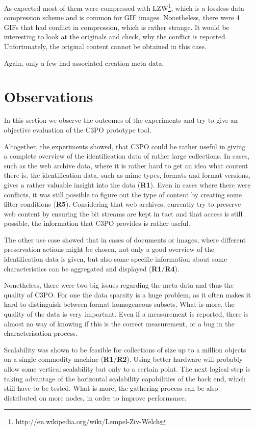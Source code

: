 As expected most of them were compressed with LZW\footnote{http://en.wikipedia.org/wiki/Lempel-Ziv-Welch}, which is a lossless data compression scheme and is common for GIF images. Nonetheless, there were 4 GIFs that had conflict in compression, which is rather strange. It would be interesting to look at the originals and check, why the conflict is reported. Unfortunately, the original content cannot be obtained in this case.

Again, only a few had associated creation meta data.

\section{Observations}
In this section we observe the outcomes of the experiments and try to give an objective evaluation of the C3PO prototype tool.

Altogether, the experiments showed, that C3PO could be rather useful in giving a complete overview of the identification data of rather large collections. In cases, such as the web archive data, where it is rather hard to get an idea what content there is, the identification data, such as mime types, formats and format versions, gives a rather valuable insight into the data (\textbf{R1}). Even in cases where there were conflicts, it was still possible to figure out the type of content by creating some filter conditions (\textbf{R5}). Considering that web archives, currently try to preserve web content by ensuring the bit streams are kept in tact and that access is still possible, the information that C3PO provides is rather useful. 

The other use case showed that in cases of documents or images, where different preservation actions might be chosen, not only a good overview of the identification data is given, but also some specific information about some characteristics can be aggregated and displayed (\textbf{R1}/\textbf{R4}).

Nonetheless, there were two big issues regarding the meta data and thus the quality of C3PO. For one the data sparsity is a huge problem, as it often makes it hard to distinguish between format homogeneous subsets. What is more, the quality of the data is very important. Even if a measurement is reported, there is almost no way of knowing if this is the correct measurement, or a bug in the characterisation process.

Scalability was shown to be feasible for collections of size up to a million objects on a single commodity machine (\textbf{R1}/\textbf{R2}). Using  better hardware will probably allow some vertical scalability but only to a certain point. The next logical step is taking advantage of the horizontal scalability capabilities of the back end, which still have to be tested. What is more, the gathering process can be also distributed on more nodes, in order to improve performance.

